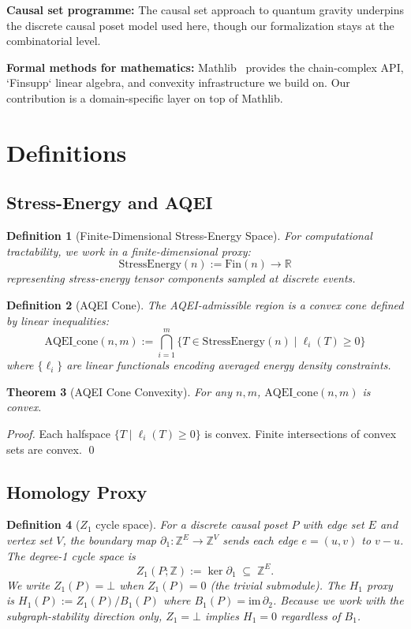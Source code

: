 \documentclass[12pt]{article}
\newtheorem{theorem}{Theorem}[section]
\newtheorem{definition}[theorem]{Definition}
\begin{document}
\textbf{Causal set programme:} The causal set approach to quantum gravity
underpins the discrete causal poset model used here, though our formalization
stays at the combinatorial level.

\textbf{Formal methods for mathematics:} Mathlib~\cite{mathlib2020} provides
the chain-complex API, `Finsupp` linear algebra, and convexity infrastructure
we build on. Our contribution is a domain-specific layer on top of Mathlib.

\section{Definitions}

\subsection{Stress-Energy and AQEI}

\begin{definition}[Finite-Dimensional Stress-Energy Space]
For computational tractability, we work in a finite-dimensional proxy:
\[
\text{StressEnergy}(n) := \text{Fin}(n) \to \mathbb{R}
\]
representing stress-energy tensor components sampled at discrete events.
\end{definition}

\begin{definition}[AQEI Cone]
The AQEI-admissible region is a convex cone defined by linear inequalities:
\[
\text{AQEI\_cone}(n, m) := \bigcap_{i=1}^{m} \{T \in \text{StressEnergy}(n) \mid \ell_i(T) \geq 0\}
\]
where $\{\ell_i\}$ are linear functionals encoding averaged energy density constraints.
\end{definition}

\begin{theorem}[AQEI Cone Convexity]\label{thm:convex}
For any $n, m$, $\text{AQEI\_cone}(n,m)$ is convex.
\end{theorem}

\begin{proof}
Each halfspace $\{T \mid \ell_i(T) \geq 0\}$ is convex. Finite intersections of convex sets are convex. \qed
\end{proof}

\subsection{Homology Proxy}

\begin{definition}[$Z_1$ cycle space]
For a discrete causal poset $P$ with edge set $E$ and vertex set $V$,
the boundary map $\partial_1 : \mathbb{Z}^E \to \mathbb{Z}^V$ sends each
edge $e = (u,v)$ to $v - u$.  The \emph{degree-1 cycle space} is
\[
  Z_1(P;\mathbb{Z}) := \ker \partial_1 \;\subseteq\; \mathbb{Z}^E.
\]
We write $Z_1(P) = \bot$ when $Z_1(P) = 0$ (the trivial submodule).
The $H_1$ proxy is $H_1(P) := Z_1(P) / B_1(P)$ where
$B_1(P) = \mathrm{im}\, \partial_2$.
Because we work with the subgraph-stability direction only, $Z_1 = \bot$
implies $H_1 = 0$ regardless of $B_1$.
\end{definition}
\end{document}
